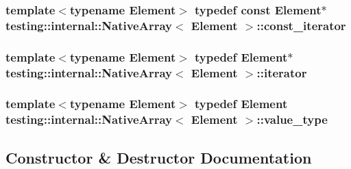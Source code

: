 \subsubsection[{\texorpdfstring{const\+\_\+iterator}{const_iterator}}]{\setlength{\rightskip}{0pt plus 5cm}template$<$typename Element$>$ typedef const Element$\ast$ {\bf testing\+::internal\+::\+Native\+Array}$<$ Element $>$\+::{\bf const\+\_\+iterator}}\hypertarget{classtesting_1_1internal_1_1NativeArray_a9ce7c8408460d7158a2870456d134557}{}\label{classtesting_1_1internal_1_1NativeArray_a9ce7c8408460d7158a2870456d134557}
\subsubsection[{\texorpdfstring{iterator}{iterator}}]{\setlength{\rightskip}{0pt plus 5cm}template$<$typename Element$>$ typedef Element$\ast$ {\bf testing\+::internal\+::\+Native\+Array}$<$ Element $>$\+::{\bf iterator}}\hypertarget{classtesting_1_1internal_1_1NativeArray_ac1301a57977b57a1ad013e4e25fc2a72}{}\label{classtesting_1_1internal_1_1NativeArray_ac1301a57977b57a1ad013e4e25fc2a72}
\subsubsection[{\texorpdfstring{value\+\_\+type}{value_type}}]{\setlength{\rightskip}{0pt plus 5cm}template$<$typename Element$>$ typedef Element {\bf testing\+::internal\+::\+Native\+Array}$<$ Element $>$\+::{\bf value\+\_\+type}}\hypertarget{classtesting_1_1internal_1_1NativeArray_a12216d686e16e4cc63d952fada5b2ba9}{}\label{classtesting_1_1internal_1_1NativeArray_a12216d686e16e4cc63d952fada5b2ba9}


\subsection{Constructor \& Destructor Documentation}
